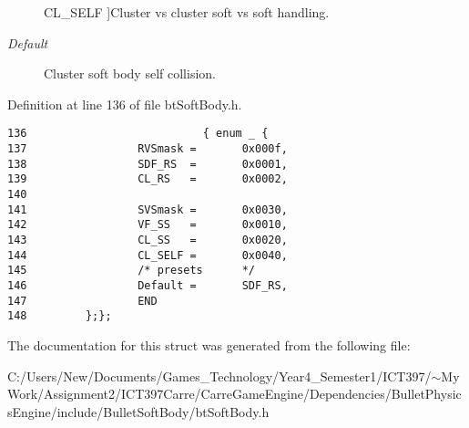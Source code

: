 \begin{Desc}
\begin{description}
{\hypertarget{structbt_soft_body_1_1f_collision_feb40bef0380b8db7e9e5628cc5f08d571505ee64a4a976707c73ec67cfcd533}{
CL\_\-SELF}
\label{structbt_soft_body_1_1f_collision_feb40bef0380b8db7e9e5628cc5f08d571505ee64a4a976707c73ec67cfcd533}
}]Cluster vs cluster soft vs soft handling. \item[{\em 
\hypertarget{structbt_soft_body_1_1f_collision_feb40bef0380b8db7e9e5628cc5f08d51c6fb7a4f36642982c053815889133e5}{
Default}
\label{structbt_soft_body_1_1f_collision_feb40bef0380b8db7e9e5628cc5f08d51c6fb7a4f36642982c053815889133e5}
}]Cluster soft body self collision. \end{description}
\end{Desc}



Definition at line 136 of file btSoftBody.h.

\begin{Code}\begin{verbatim}136                           { enum _ {
137                 RVSmask =       0x000f, 
138                 SDF_RS  =       0x0001, 
139                 CL_RS   =       0x0002, 
140 
141                 SVSmask =       0x0030, 
142                 VF_SS   =       0x0010, 
143                 CL_SS   =       0x0020, 
144                 CL_SELF =       0x0040, 
145                 /* presets      */ 
146                 Default =       SDF_RS,
147                 END
148         };};
\end{verbatim}
\end{Code}




The documentation for this struct was generated from the following file:\begin{CompactItemize}
\item 
C:/Users/New/Documents/Games\_\-Technology/Year4\_\-Semester1/ICT397/$\sim$My Work/Assignment2/ICT397Carre/CarreGameEngine/Dependencies/BulletPhysicsEngine/include/BulletSoftBody/btSoftBody.h\end{CompactItemize}
